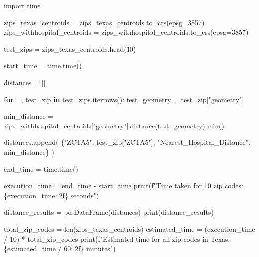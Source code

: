 \documentclass[
  letterpaper,
  DIV=11,
  numbers=noendperiod]{scrartcl}
\newenvironment{Shaded}{\begin{snugshade}}{\end{snugshade}}
\newcommand{\BuiltInTok}[1]{\textcolor[rgb]{0.00,0.23,0.31}{#1}}
\newcommand{\ControlFlowTok}[1]{\textcolor[rgb]{0.00,0.23,0.31}{\textbf{#1}}}
\newcommand{\DecValTok}[1]{\textcolor[rgb]{0.68,0.00,0.00}{#1}}
\newcommand{\ImportTok}[1]{\textcolor[rgb]{0.00,0.46,0.62}{#1}}
\newcommand{\KeywordTok}[1]{\textcolor[rgb]{0.00,0.23,0.31}{\textbf{#1}}}
\newcommand{\NormalTok}[1]{\textcolor[rgb]{0.00,0.23,0.31}{#1}}
\newcommand{\OperatorTok}[1]{\textcolor[rgb]{0.37,0.37,0.37}{#1}}
\newcommand{\SpecialCharTok}[1]{\textcolor[rgb]{0.37,0.37,0.37}{#1}}
\newcommand{\SpecialStringTok}[1]{\textcolor[rgb]{0.13,0.47,0.30}{#1}}
\newcommand{\StringTok}[1]{\textcolor[rgb]{0.13,0.47,0.30}{#1}}
\begin{document}
\begin{Shaded}
\begin{Highlighting}[]
\ImportTok{import}\NormalTok{ time }

\NormalTok{zips\_texas\_centroids }\OperatorTok{=}\NormalTok{ zips\_texas\_centroids.to\_crs(epsg}\OperatorTok{=}\DecValTok{3857}\NormalTok{)}
\NormalTok{zips\_withhospital\_centroids }\OperatorTok{=}\NormalTok{ zips\_withhospital\_centroids.to\_crs(epsg}\OperatorTok{=}\DecValTok{3857}\NormalTok{)}

\NormalTok{test\_zips }\OperatorTok{=}\NormalTok{ zips\_texas\_centroids.head(}\DecValTok{10}\NormalTok{)}

\NormalTok{start\_time }\OperatorTok{=}\NormalTok{ time.time()}

\NormalTok{distances }\OperatorTok{=}\NormalTok{ []}

\ControlFlowTok{for}\NormalTok{ \_, test\_zip }\KeywordTok{in}\NormalTok{ test\_zips.iterrows():}
\NormalTok{    test\_geometry }\OperatorTok{=}\NormalTok{ test\_zip[}\StringTok{"geometry"}\NormalTok{]}

\NormalTok{    min\_distance }\OperatorTok{=}\NormalTok{ zips\_withhospital\_centroids[}\StringTok{"geometry"}\NormalTok{].distance(test\_geometry).}\BuiltInTok{min}\NormalTok{()}

\NormalTok{    distances.append(}
\NormalTok{        \{}\StringTok{"ZCTA5"}\NormalTok{: test\_zip[}\StringTok{"ZCTA5"}\NormalTok{], }\StringTok{"Nearest\_Hospital\_Distance"}\NormalTok{: min\_distance\}}
\NormalTok{    )}

\NormalTok{end\_time }\OperatorTok{=}\NormalTok{ time.time()}

\NormalTok{execution\_time }\OperatorTok{=}\NormalTok{ end\_time }\OperatorTok{{-}}\NormalTok{ start\_time}
\BuiltInTok{print}\NormalTok{(}\SpecialStringTok{f"Time taken for 10 zip codes: }\SpecialCharTok{\{}\NormalTok{execution\_time}\SpecialCharTok{:.2f\}}\SpecialStringTok{ seconds"}\NormalTok{)}

\NormalTok{distance\_results }\OperatorTok{=}\NormalTok{ pd.DataFrame(distances)}
\BuiltInTok{print}\NormalTok{(distance\_results)}

\NormalTok{total\_zip\_codes }\OperatorTok{=} \BuiltInTok{len}\NormalTok{(zips\_texas\_centroids)}
\NormalTok{estimated\_time }\OperatorTok{=}\NormalTok{ (execution\_time }\OperatorTok{/} \DecValTok{10}\NormalTok{) }\OperatorTok{*}\NormalTok{ total\_zip\_codes}
\BuiltInTok{print}\NormalTok{(}\SpecialStringTok{f"Estimated time for all zip codes in Texas: }\SpecialCharTok{\{}\NormalTok{estimated\_time }\OperatorTok{/} \DecValTok{60}\SpecialCharTok{:.2f\}}\SpecialStringTok{ minutes"}\NormalTok{)}
\end{Highlighting}
\end{Shaded}
\end{document}
